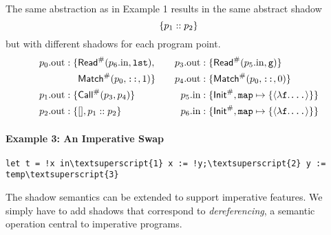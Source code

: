 \documentclass{article}
\begin{document}
The same abstraction as in Example 1 results in the same abstract shadow
\[\{p_1::p_2\}\]
but with different shadows for each program point.
\begin{align*}
  p_0.\text{out} :\{ & {\mathsf{Read}}^{\#}(p_6.\text{in},\texttt{lst}),   &  &  & p_3.\text{out}:\{ & {\mathsf{Read}}^{\#}(p_5.\text{in},\texttt{g})\}                                     \\
                           & {\textsf{Match}}^{\#}(p_0,\texttt{::},1)\} &  &  & p_4.\text{out}:\{ & {\textsf{Match}}^{\#}(p_0,\texttt{::},0)\}                                  \\
  p_1.\text{out} :\{ & {\mathsf{Call}}^{\#}(p_3,p_4)\}               &  &  & p_5.\text{in} :\{ & {\mathsf{Init}}^{\#},\texttt{map}\mapsto\{\langle\lambda\texttt{f}.\texttt{...}\rangle\}\} \\
  p_2.\text{out} :\{ & [],p_1:: p_2\}                   &  &  & p_6.\text{in} :\{ & {\mathsf{Init}}^{\#},\texttt{map}\mapsto\{\langle\lambda\texttt{f}.\texttt{...}\rangle\}\}
\end{align*}

\paragraph{Example 3: An Imperative Swap}
\begin{center}
  \begin{BVerbatim}[commandchars=\\\{\}]
let t = !x in\textsuperscript{1} x := !y;\textsuperscript{2} y := temp\textsuperscript{3}
  \end{BVerbatim}
\end{center}
The shadow semantics can be extended to support imperative features.
We simply have to add shadows that correspond to \emph{dereferencing}, a semantic
operation central to imperative programs.
\end{document}
